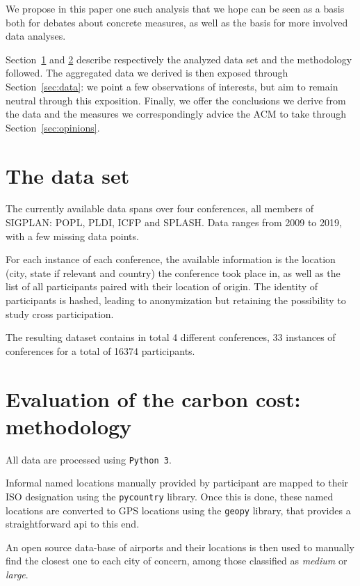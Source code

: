 \documentclass{scrartcl}
\newcommand{\python}{\texttt{Python 3}}
\begin{document}
We propose in this paper one such analysis that we hope can be seen as a basis both for
debates about concrete measures, as well as the basis for more involved data analyses.

Section~\ref{sec:dataset} and \ref{sec:methodo} describe respectively the
analyzed data set and the methodology followed. The aggregated data
we derived is then exposed through Section~\ref{sec:data}: we point a few
observations of interests, but aim to remain neutral through this exposition.
Finally, we offer the conclusions we derive from the data and the measures we
correspondingly advice the ACM to take through Section~\ref{sec:opinions}.

\section{The data set}
\label{sec:dataset}

The currently available data spans over four conferences, all members of
SIGPLAN: POPL, PLDI, ICFP and SPLASH. Data ranges from 2009 to 2019, with a few
missing data points.

For each instance of each conference, the available information is the location
(city, state if relevant and country) the conference took place in, as well as
the list of all participants paired with their location of origin. The identity
of participants is hashed, leading to anonymization but retaining the
possibility to study cross participation.

The resulting dataset contains in total 4 different conferences, 33
instances of conferences for a total of 16374 participants.

\section{Evaluation of the carbon cost: methodology}
\label{sec:methodo}

All data are processed using \python.

Informal named locations manually provided by participant are mapped to their
ISO designation using the \texttt{pycountry} library.
Once this is done, these named locations are converted to GPS
locations using the \texttt{geopy} library, that provides a straightforward api
to this end.

An open source data-base of airports and their locations is then used to
manually find the closest one to each city of concern, among those classified as
\emph{medium} or \emph{large}.
\end{document}

